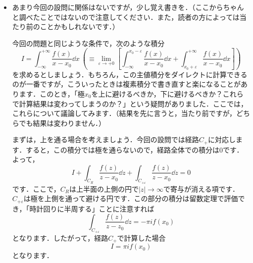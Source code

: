 \documentclass[a4paper,pdflatex,ja=standard]{bxjsarticle}
\begin{document}
\begin{itemize}

  \item 

  あまり今回の設問に関係はないですが，少し覚え書きを．（ここからちゃんと調べたことではないので注意してください．また，読者の方によっては当たり前のことかもしれないです．）

  今回の問題と同じような条件で，次のような積分
  \begin{equation}
    I
    =
    \int_{-\infty}^{+\infty}
    \frac{f(x)}{x-x_0}
    \dd x
    \ 
    \left(  
      \equiv
      \lim_{\varepsilon\rightarrow+0}
      \left[  
        \int_{-\infty}^{x_0-\varepsilon}
        \frac{f(x)}{x-x_0}
        \dd x
        +
        \int_{x_0+\varepsilon}^{+\infty}
        \frac{f(x)}{x-x_0}
        \dd x
      \right]
    \right)
  \end{equation}
  を求めるとしましょう．もちろん，この主値積分をダイレクトに計算できるのが一番ですが，こういったときは複素積分で書き直すと楽になることがあります．このとき，「極$x_0$を上に避けるべきか，下に避けるべきか？これらで計算結果は変わってしまうのか？」という疑問がありました．ここでは，これらについて議論してみます．（結果を先に言うと，当たり前ですが，どちらでも結果は変わりません．）

  まずは，上を通る場合を考えましょう．今回の設問では経路$C_{+}$に対応します．すると，この積分では極を通らないので，経路全体での積分は0です．よって，
  \begin{equation}
    I
    +
    \int_{C_{R}}
    \frac{f(z)}{z-x_0}
    \dd z
    +
    \int_{C_{+\varepsilon}}
    \frac{f(z)}{z-x_0}
    \dd z
    =
    0
  \end{equation}
  です．ここで，$C_{R}$は上半面の上側の円で$|z|\rightarrow\infty$で寄与が消える項です．$C_{+\varepsilon}$は極を上側を通って避ける円です．この部分の積分は留数定理で評価でき，「時計回りに半周する」ことに注意すれば
  \begin{equation}    
    \int_{C_{+\varepsilon}}
    \frac{f(z)}{z-z_0}
    \dd z
    =
    -\pi if(x_0)
  \end{equation}
  となります．したがって，経路$C_{+}$で計算した場合
  \begin{equation}
    I
    =
    \pi if(x_0)
  \end{equation}
  となります．


\end{itemize}
\end{document}

